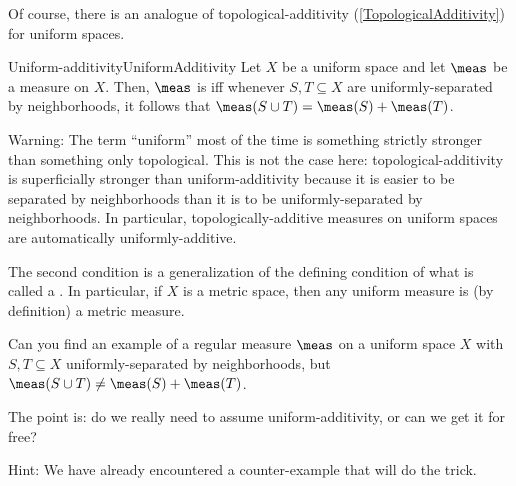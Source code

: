 Of course, there is an analogue of topological-additivity (\cref{TopologicalAdditivity}) for uniform spaces.
\begin{dfn}{Uniform-additivity}{UniformAdditivity}
Let $X$ be a uniform space and let $\meas$ be a measure on $X$.  Then, $\meas$ is  iff whenever $S,T\subseteq X$ are uniformly-separated by neighborhoods, it follows that $\meas (S\cup T)=\meas (S)+\meas (T)$.
\begin{wrn}
Warning:  The term ``uniform'' most of the time is something strictly stronger than something only topological.  This is not the case here:  topological-additivity is superficially stronger than uniform-additivity because it is easier to be separated by neighborhoods than it is to be uniformly-separated by neighborhoods.  In particular, topologically-additive measures on uniform spaces are automatically uniformly-additive.
\end{wrn}
\begin{rmk}
The second condition is a generalization of the defining condition of what is called a .  In particular, if $X$ is a metric space, then any uniform measure is (by definition) a metric measure.
\end{rmk}
\end{dfn}
\begin{exr}{}{}
Can you find an example of a regular measure $\meas$ on a uniform space $X$ with $S,T\subseteq X$ uniformly-separated by neighborhoods, but $\meas (S\cup T)\neq \meas (S)+\meas (T)$.
\begin{rmk}
The point is:  do we really need to assume uniform-additivity, or can we get it for free?
\end{rmk}
\begin{rmk}
Hint:  We have already encountered a counter-example that will do the trick.
\end{rmk}
\end{exr}
